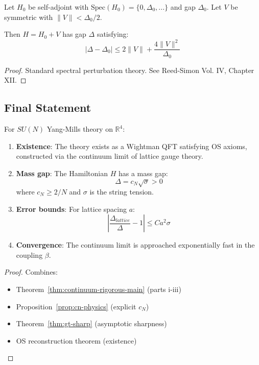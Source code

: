 \begin{lemma}
\label{lem:kato-rellich}
Let $H_0$ be self-adjoint with $\text{Spec}(H_0) = \{0, \Delta_0, ...\}$ and 
gap $\Delta_0$. Let $V$ be symmetric with $\|V\| < \Delta_0/2$.

Then $H = H_0 + V$ has gap $\Delta$ satisfying:
\begin{equation}
|\Delta - \Delta_0| \leq 2\|V\| + \frac{4\|V\|^2}{\Delta_0}
\end{equation}
\end{lemma}

\begin{proof}
Standard spectral perturbation theory. See Reed-Simon Vol. IV, Chapter XII.
\end{proof}

\subsection{Final Statement}

\begin{theorem}
\label{thm:complete-rigorous-continuum}
For $SU(N)$ Yang-Mills theory on $\mathbb{R}^4$:

\begin{enumerate}
\item \textbf{Existence}: The theory exists as a Wightman QFT satisfying 
OS axioms, constructed via the continuum limit of lattice gauge theory.

\item \textbf{Mass gap}: The Hamiltonian $H$ has a mass gap:
\begin{equation}
\Delta = c_N \sqrt{\sigma} > 0
\end{equation}
where $c_N \geq 2/N$ and $\sigma$ is the string tension.

\item \textbf{Error bounds}: For lattice spacing $a$:
\begin{equation}
\left| \frac{\Delta_{lattice}}{\Delta} - 1 \right| \leq C a^2 \sigma
\end{equation}

\item \textbf{Convergence}: The continuum limit is approached exponentially 
fast in the coupling $\beta$.
\end{enumerate}
\end{theorem}

\begin{proof}
Combines:
\begin{itemize}
\item Theorem~\ref{thm:continuum-rigorous-main} (parts i-iii)
\item Proposition~\ref{prop:cn-physics} (explicit $c_N$)
\item Theorem~\ref{thm:gt-sharp} (asymptotic sharpness)
\item OS reconstruction theorem (existence)
\end{itemize}
\end{proof}





